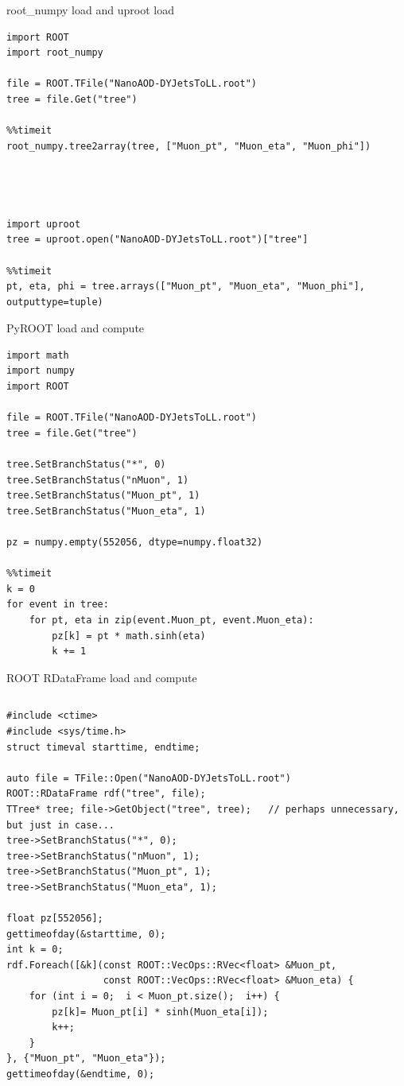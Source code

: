 \documentclass[aspectratio=169]{beamer}
\begin{document}
\begin{frame}[fragile]{root\_numpy load and uproot load}
\scriptsize
\begin{verbatim}
import ROOT
import root_numpy

file = ROOT.TFile("NanoAOD-DYJetsToLL.root")
tree = file.Get("tree")

%%timeit
root_numpy.tree2array(tree, ["Muon_pt", "Muon_eta", "Muon_phi"])




import uproot
tree = uproot.open("NanoAOD-DYJetsToLL.root")["tree"]

%%timeit
pt, eta, phi = tree.arrays(["Muon_pt", "Muon_eta", "Muon_phi"], outputtype=tuple)
\end{verbatim}
\end{frame}

\begin{frame}[fragile]{PyROOT load and compute}
\scriptsize
\begin{verbatim}
import math
import numpy
import ROOT

file = ROOT.TFile("NanoAOD-DYJetsToLL.root")
tree = file.Get("tree")

tree.SetBranchStatus("*", 0)
tree.SetBranchStatus("nMuon", 1)
tree.SetBranchStatus("Muon_pt", 1)
tree.SetBranchStatus("Muon_eta", 1)

pz = numpy.empty(552056, dtype=numpy.float32)

%%timeit
k = 0
for event in tree:
    for pt, eta in zip(event.Muon_pt, event.Muon_eta):
        pz[k] = pt * math.sinh(eta)
        k += 1
\end{verbatim}
\end{frame}

\begin{frame}[fragile]{ROOT RDataFrame load and compute}
\vspace{0.1 cm}
\scriptsize
\begin{columns}
\begin{verbatim}
#include <ctime>
#include <sys/time.h>
struct timeval starttime, endtime;

auto file = TFile::Open("NanoAOD-DYJetsToLL.root")
ROOT::RDataFrame rdf("tree", file);
TTree* tree; file->GetObject("tree", tree);   // perhaps unnecessary, but just in case...
tree->SetBranchStatus("*", 0);
tree->SetBranchStatus("nMuon", 1);
tree->SetBranchStatus("Muon_pt", 1);
tree->SetBranchStatus("Muon_eta", 1);

float pz[552056];
gettimeofday(&starttime, 0);
int k = 0;
rdf.Foreach([&k](const ROOT::VecOps::RVec<float> &Muon_pt,
                 const ROOT::VecOps::RVec<float> &Muon_eta) {
    for (int i = 0;  i < Muon_pt.size();  i++) {
        pz[k]= Muon_pt[i] * sinh(Muon_eta[i]);
        k++;
    }
}, {"Muon_pt", "Muon_eta"});
gettimeofday(&endtime, 0);
\end{verbatim}
\end{columns}
\end{frame}
\end{document}
